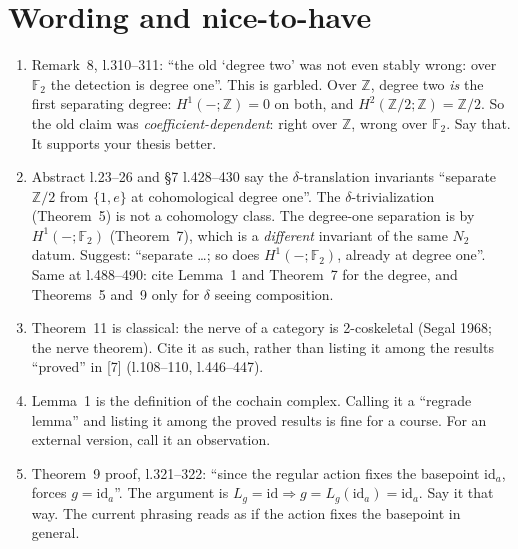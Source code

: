 \documentclass[11pt]{article}
\newcommand{\Z}{\mathbb{Z}}
\newcommand{\F}{\mathbb{F}}
\begin{document}
\section{Wording and nice-to-have}
\begin{enumerate}[label=\textbf{W\arabic*},leftmargin=*]
\item Remark~8, l.310--311: ``the old `degree two' was not even stably wrong: over $\F_2$ the
detection is degree one''. This is garbled. Over $\Z$, degree two \emph{is} the first separating
degree: $H^1(-;\Z)=0$ on both, and $H^2(\Z/2;\Z)=\Z/2$. So the old claim was
\emph{coefficient-dependent}: right over $\Z$, wrong over $\F_2$. Say that. It supports your
thesis better.
\item Abstract l.23--26 and \S7 l.428--430 say the $\delta$-translation invariants ``separate
$\Z/2$ from $\{1,e\}$ at cohomological degree one''. The $\delta$-trivialization (Theorem~5) is not
a cohomology class. The degree-one separation is by $H^1(-;\F_2)$ (Theorem~7), which is a
\emph{different} invariant of the same $N_2$ datum. Suggest: ``separate \dots; so does
$H^1(-;\F_2)$, already at degree one''. Same at l.488--490: cite Lemma~1 and Theorem~7 for the
degree, and Theorems~5 and~9 only for $\delta$ seeing composition.
\item Theorem~11 is classical: the nerve of a category is 2-coskeletal (Segal 1968; the nerve
theorem). Cite it as such, rather than listing it among the results ``proved'' in [7] (l.108--110,
l.446--447).
\item Lemma~1 is the definition of the cochain complex. Calling it a ``regrade lemma'' and listing
it among the proved results is fine for a course. For an external version, call it an observation.
\item Theorem~9 proof, l.321--322: ``since the regular action fixes the basepoint $\mathrm{id}_a$,
forces $g=\mathrm{id}_a$''. The argument is $L_g=\mathrm{id}\Rightarrow g=L_g(\mathrm{id}_a)=
\mathrm{id}_a$. Say it that way. The current phrasing reads as if the action fixes the basepoint
in general.
\end{enumerate}
\end{document}
